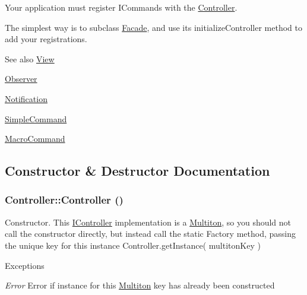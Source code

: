 Your application must register {\ttfamily ICommands} with the \hyperlink{class_pure_m_v_c_1_1_controller}{Controller}. 

The simplest way is to subclass \hyperlink{class_pure_m_v_c_1_1_facade}{Facade}, and use its {\ttfamily initializeController} method to add your registrations.

\begin{DoxySeeAlso}{See also}
\hyperlink{class_pure_m_v_c_1_1_view}{View} 

\hyperlink{class_pure_m_v_c_1_1_observer}{Observer} 

\hyperlink{class_pure_m_v_c_1_1_notification}{Notification} 

\hyperlink{class_pure_m_v_c_1_1_simple_command}{SimpleCommand} 

\hyperlink{class_pure_m_v_c_1_1_macro_command}{MacroCommand} 
\end{DoxySeeAlso}


\subsection{Constructor \& Destructor Documentation}
\hypertarget{class_pure_m_v_c_1_1_controller_a95c56822d667e94b031451729ce069a9}{
\subsubsection[{Controller}]{\setlength{\rightskip}{0pt plus 5cm}Controller::Controller ()}}
\label{class_pure_m_v_c_1_1_controller_a95c56822d667e94b031451729ce069a9}


Constructor. This {\ttfamily \hyperlink{class_pure_m_v_c_1_1_i_controller}{IController}} implementation is a \hyperlink{class_pure_m_v_c_1_1_multiton}{Multiton}, so you should not call the constructor directly, but instead call the static Factory method, passing the unique key for this instance {\ttfamily Controller.getInstance( multitonKey )}


\begin{DoxyExceptions}{Exceptions}
\item[{\em Error}]Error if instance for this \hyperlink{class_pure_m_v_c_1_1_multiton}{Multiton} key has already been constructed \end{DoxyExceptions}


